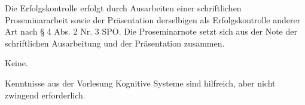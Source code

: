 \begin{course}

\setdoclanguagegerman
{}


\courseinstructionlanguage{}

\coursehead


\label{cour_10705.dp_997}


\begin{styleenv}
\begin{assessment}
Die Erfolgskontrolle erfolgt durch Ausarbeiten einer schriftlichen Proseminararbeit sowie der Präsentation derselbigen als Erfolgskontrolle anderer Art nach § 4 Abs. 2 Nr. 3 SPO.\newline
\newline
 Die Proseminarnote setzt sich aus der Note der schriftlichen Ausarbeitung und der Präsentation zusammen.


\end{assessment}

\begin{conditions}Keine.\end{conditions}

\begin{recommendations}Kenntnisse aus der Vorlesung Kognitive Systeme sind hilfreich, aber nicht zwingend erforderlich.

\end{recommendations}
\end{styleenv}


\end{course}
